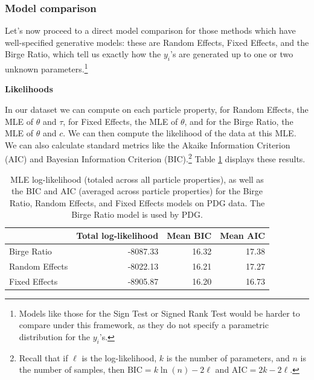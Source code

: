 \documentclass[12pt]{article}
\begin{document}
\subsubsection{Model comparison}\label{model-comparison}

Let's now proceed to a direct model comparison for those methods which have well-specified generative models: these are Random Effects, Fixed Effects, and the Birge Ratio, which tell us exactly how the $y_i$'s are generated up to one or two unknown parameters.\footnote{Models like those for the Sign Test or Signed Rank Test would be harder to compare under this framework, as they do not specify a parametric distribution for the $y_i$'s.}

\textbf{Likelihoods}

In our dataset we can compute on each particle property, for Random Effects, the MLE of $\theta$ and $\tau$, for Fixed Effects, the MLE of $\theta$, and for the Birge Ratio, the MLE of $\theta$ and $c$. We can then compute the likelihood of the data at this MLE. We can also calculate standard metrics like the Akaike Information Criterion (AIC) and Bayesian Information Criterion (BIC).\footnote{Recall that if $\ell$ is the log-likelihood, $k$ is the number of parameters, and $n$ is the number of samples, then $\mathrm{BIC}=k\ln(n)-2\ell$ and $\mathrm{AIC}=2k-2\ell$.}  Table \ref{tab:pdg-loglike} displays these results.

\begin{table}
  \centering
  \caption{MLE log-likelihood (totaled across all particle properties), as well as the BIC and AIC (averaged across particle properties) for the Birge Ratio, Random Effects, and Fixed Effects models on PDG data. The Birge Ratio model is used by PDG.}
  \label{tab:pdg-loglike}
  \begin{tabular}{lrrr}
    \hline
     & Total log-likelihood & Mean BIC & Mean AIC \\
    \hline
    Birge Ratio & -8087.33 & 16.32 & 17.38 \\
    Random Effects & -8022.13 & 16.21 & 17.27 \\
    Fixed Effects & -8905.87 & 16.20 & 16.73 \\
    \hline
    \end{tabular}
\end{table}
\end{document}

